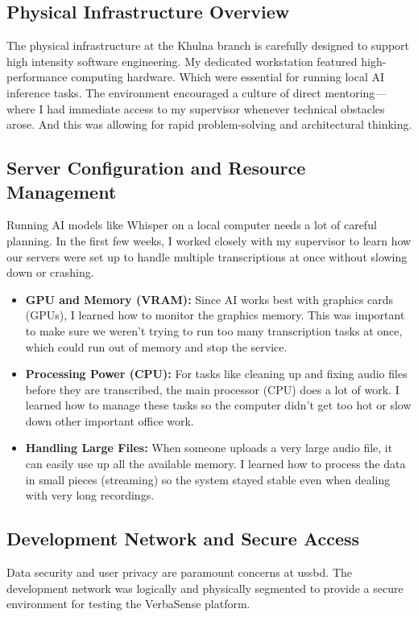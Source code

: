 \documentclass[oneside]{thesis-library}
\begin{document}
\subsection{Physical Infrastructure Overview}
The physical infrastructure at the Khulna branch is carefully designed to support high intensity software engineering. My dedicated workstation featured high-performance computing hardware. Which were essential for running local AI inference tasks. The environment encouraged a culture of direct mentoring---where I had immediate access to my supervisor whenever technical obstacles arose. And this was allowing for rapid problem-solving and architectural thinking.

\subsection{Server Configuration and Resource Management}
Running AI models like Whisper on a local computer needs a lot of careful planning. In the first few weeks, I worked closely with my supervisor to learn how our servers were set up to handle multiple transcriptions at once without slowing down or crashing.

\begin{itemize}
    \item \textbf{GPU and Memory (VRAM):} Since AI works best with graphics cards (GPUs), I learned how to monitor the graphics memory. This was important to make sure we weren't trying to run too many transcription tasks at once, which could run out of memory and stop the service.
    \item \textbf{Processing Power (CPU):} For tasks like cleaning up and fixing audio files before they are transcribed, the main processor (CPU) does a lot of work. I learned how to manage these tasks so the computer didn't get too hot or slow down other important office work.
    \item \textbf{Handling Large Files:} When someone uploads a very large audio file, it can easily use up all the available memory. I learned how to process the data in small pieces (streaming) so the system stayed stable even when dealing with very long recordings.
\end{itemize}

\subsection{Development Network and Secure Access}
Data security and user privacy are paramount concerns at \Gls{ussbd}. The development network was logically and physically segmented to provide a secure environment for testing the VerbaSense platform.
\end{document}
